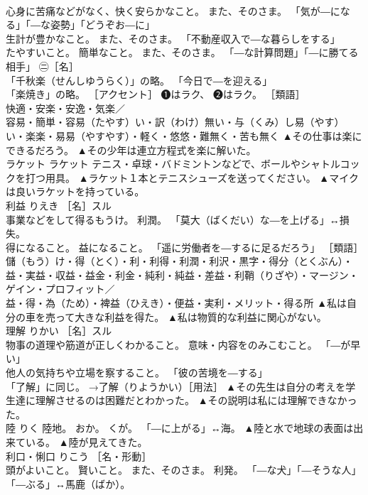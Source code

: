\documentclass[8pt]{extreport}
\begin{document}
\begin{CJK}{UTF8}{min}
\\	心身に苦痛などがなく、快く安らかなこと。 また、そのさま。 「気が―になる」「―な姿勢」「どうぞお―に」 
\\	生計が豊かなこと。 また、そのさま。 「不動産収入で―な暮らしをする」 
\\	たやすいこと。 簡単なこと。 また、そのさま。 「―な計算問題」「―に勝てる相手」 ㊁［名］ 
\\	「千秋楽（せんしゆうらく）」の略。 「今日で―を迎える」 
\\	「楽焼き」の略。 ［アクセント］ ❶はラク、 ❷はラク。 ［類語］ 
\\	快適・安楽・安逸・気楽／
\\	容易・簡単・容易（たやす）い・訳（わけ）無い・与（くみ）し易（やす）い・楽楽・易易（やすやす）・軽く・悠悠・難無く・苦も無く	▲その仕事は楽にできるだろう。 ▲その少年は連立方程式を楽に解いた。
\\	ラケット	ラケット	テニス・卓球・バドミントンなどで、ボールやシャトルコックを打つ用具。	▲ラケット１本とテニスシューズを送ってください。 ▲マイクは良いラケットを持っている。
\\	利益	りえき	［名］スル 
\\	事業などをして得るもうけ。 利潤。 「莫大（ばくだい）な―を上げる」↔損失。 
\\	得になること。 益になること。 「遥に労働者を―するに足るだろう」 ［類語］
\\	儲（もう）け・得（とく）・利・利得・利潤・利沢・黒字・得分（とくぶん）・益・実益・収益・益金・利金・純利・純益・差益・利鞘（りざや）・マージン・ゲイン・プロフィット／
\\	益・得・為（ため）・裨益（ひえき）・便益・実利・メリット・得る所	▲私は自分の車を売って大きな利益を得た。 ▲私は物質的な利益に関心がない。
\\	理解	りかい	［名］スル 
\\	物事の道理や筋道が正しくわかること。 意味・内容をのみこむこと。 「―が早い」 
\\	他人の気持ちや立場を察すること。 「彼の苦境を―する」 
\\	「了解」に同じ。 →了解（りようかい）［用法］	▲その先生は自分の考えを学生達に理解させるのは困難だとわかった。 ▲その説明は私には理解できなかった。
\\	陸	りく	陸地。 おか。 くが。 「―に上がる」↔海。	▲陸と水で地球の表面は出来ている。 ▲陸が見えてきた。
\\	利口・悧口	りこう	［名・形動］ 
\\	頭がよいこと。 賢いこと。 また、そのさま。 利発。 「―な犬」「―そうな人」「―ぶる」↔馬鹿（ばか）。 

\end{CJK}
\end{document}
